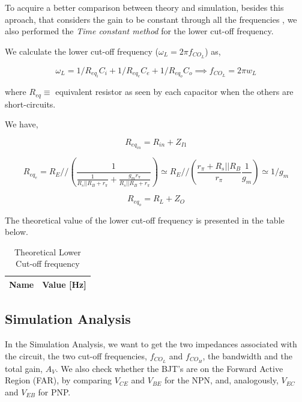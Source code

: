 To acquire a better comparison between theory and simulation, besides this aproach, that considers the gain to be constant through all the frequencies , we also performed the \textit{Time constant method} for the lower cut-off frequency.

We calculate the lower cut-off frequency ($\omega_L=2\pi f_{CO_L}$) as,

\begin{equation}
    \omega_L=1/{R_{eq_i}C_i} + 1/{R_{eq_e}C_e} + 1/{R_{eq_o}C_o}
    \implies f_{CO_L}=2\pi w_L
\end{equation}

where $R_{eq}\equiv$ equivalent resistor as seen by each capacitor when the others are short-circuits.

We have,

\begin{equation}
    R_{eq_{in}} = R_{in}+Z_{I1}
\end{equation}

\begin{equation}
    R_{eq_e} = R_E // (\frac{1}{\frac{1}{R_s||R_B+r_{\pi}}+\frac{g_m r_{\pi}}{R_s||R_B+r_{\pi}}}) \simeq R_E//(\frac{r_{\pi}+R_s||R_B}{r_{\pi}}\frac{1}{g_m}) \simeq 1/g_{m}
\end{equation}

\begin{equation}
    R_{eq_o}=R_L+Z_{O}
\end{equation}

The theoretical value of the lower cut-off frequency is presented in the table below.

\begin{table}[h]
    \centering
    \begin{tabular}{|l|c|}
    \hline
    {\bf Name} & {\bf Value [Hz]} \\ \hline
    
    \end{tabular}
    \caption{Theoretical Lower Cut-off frequency}
    \label{tab:theo_CO_freq}
\end{table}

\pagebreak

\subsection{Simulation Analysis}
\label{subsec:Req}

In the Simulation Analysis, we want to get the two impedances associated with the circuit, the two cut-off frequencies, $f_{CO_L}$ and $f_{CO_H}$, the bandwidth and the total gain, $A_V$.
We also check whether the BJT's are on the Forward Active Region (FAR), by comparing $V_{CE}$ and $V_{BE}$ for the NPN, and, analogously, $V_{EC}$ and $V_{EB}$ for PNP. 


